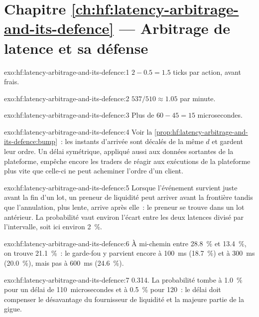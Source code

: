 \section*{Chapitre \ref{ch:hf:latency-arbitrage-and-its-defence} --- Arbitrage de latence et sa défense}

\begin{solution}{exo:hf:latency-arbitrage-and-its-defence:1}
$2-0.5=1.5$ ticks par action, avant frais.
\end{solution}

\begin{solution}{exo:hf:latency-arbitrage-and-its-defence:2}
$537/510\approx1.05$ par minute.
\end{solution}

\begin{solution}{exo:hf:latency-arbitrage-and-its-defence:3}
Plus de $60-45=15$ microsecondes.
\end{solution}

\begin{solution}{exo:hf:latency-arbitrage-and-its-defence:4}
Voir la \cref{prop:hf:latency-arbitrage-and-its-defence:bump}~: les instants d'arrivée sont décalés de la même $d$ et gardent leur ordre. Un délai symétrique, appliqué aussi
aux données sortantes de la plateforme, empêche encore les traders de réagir aux exécutions de la plateforme plus vite que celle-ci ne peut acheminer l'ordre d'un client.
\end{solution}

\begin{solution}{exo:hf:latency-arbitrage-and-its-defence:5}
Lorsque l'événement survient juste avant la fin d'un lot, un preneur de liquidité peut arriver avant la frontière tandis que l'annulation, plus lente, arrive après elle~: le preneur se trouve dans
un lot antérieur. La probabilité vaut environ l'écart entre les deux latences divisé par l'intervalle, soit ici environ 2~\%.
\end{solution}

\begin{solution}{exo:hf:latency-arbitrage-and-its-defence:6}
À mi-chemin entre 28.8~\% et 13.4~\%, on trouve 21.1~\%~: le garde-fou y parvient encore à 100~ms (18.7~\%) et à 300~ms (20.0~\%), mais pas à 600~ms (24.6~\%).
\end{solution}

\begin{solution}{exo:hf:latency-arbitrage-and-its-defence:7}
0.314. La probabilité tombe à 1.0~\% pour un délai de 110~microsecondes et à 0.5~\% pour 120~: le délai doit compenser le désavantage du fournisseur de liquidité et la majeure partie de
la gigue.
\end{solution}

